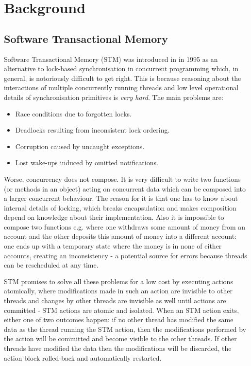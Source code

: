 \section{Background}
\label{sec:background}

\subsection{Software Transactional Memory}
Software Transactional Memory (STM) was introduced in \cite{shavit_software_1995} in 1995 as an alternative to lock-based synchronisation in concurrent programming which, in general, is notoriously difficult to get right. This is because reasoning about the interactions of multiple concurrently running threads and low level operational details of synchronisation primitives is \textit{very hard}. The main problems are:

\begin{itemize}
	\item Race conditions due to forgotten locks.
	\item Deadlocks resulting from inconsistent lock ordering.
	\item Corruption caused by uncaught exceptions.
	\item Lost wake-ups induced by omitted notifications.
\end{itemize}

Worse, concurrency does not compose. It is very difficult to write two functions (or methods in an object) acting on concurrent data which can be composed into a larger concurrent behaviour. The reason for it is that one has to know about internal details of locking, which breaks encapsulation and makes composition depend on knowledge about their implementation. Also it is impossible to compose two  functions e.g. where one withdraws some amount of money from an account and the other deposits this amount of money into a different account: one ends up with a temporary state where the money is in none of either accounts, creating an inconsistency - a potential source for errors because threads can be rescheduled at any time.

STM promises to solve all these problems for a low cost by executing actions atomically, where modifications made in such an action are invisible to other threads and changes by other threads are invisible as well until actions are committed - STM actions are atomic and isolated. When an STM action exits, either one of two outcomes happen: if no other thread has modified the same data as the thread running the STM action, then the modifications performed by the action will be committed and become visible to the other threads. If other threads have modified the data then the modifications will be discarded, the action block rolled-back and automatically restarted.

